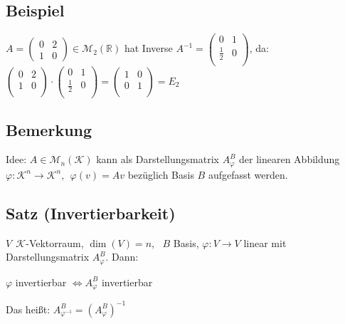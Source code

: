 \documentclass[a4paper, 12pt,titlepage, pdf, headsepline]{scrartcl}
\newcommand{\R}{\mathds{R}}
\newcommand{\K}{\mathcal{K}}
\newcommand{\M}{\mathcal{M}}
\renewcommand{\>}{\rightarrow}
\renewcommand{\*}{\cdot}
\renewcommand{\phi}{\varphi}
\begin{document}
\subsection{Beispiel}
$A = \begin{pmatrix}
0 & 2 \\
1 & 0
\end{pmatrix}\in\M_2(\R)$ hat Inverse $A^{-1} =  \begin{pmatrix}
0 & 1 \\
\frac{1}{2} & 0\\
\end{pmatrix}$, da:\\
$\begin{pmatrix}
0 & 2 \\
1 & 0 \\
\end{pmatrix} \cdot \begin{pmatrix}
0 & 1 \\
\frac{1}{2} & 0 \\
\end{pmatrix} = \begin{pmatrix}
1 & 0  \\
0 & 1 \\
\end{pmatrix} = E_2$
\subsection{Bemerkung}
\label{7.14}
Idee: $A \in \M_n(\K)$ kann als Darstellungsmatrix $A_\phi^B$ der linearen Abbildung $\phi: \K^n \rightarrow \K^n,~~ \phi(v) = Av$ bezüglich Basis $B$ aufgefasst werden.
\subsection{Satz (Invertierbarkeit)}
\label{7.15}
$V~~\K$-Vektorraum, $\dim(V) = n,~~~ B$ Basis, $\phi: V \rightarrow V$ linear mit Darstellungsmatrix $A_\phi^B$. Dann:
\begin{center}
	$\phi$ invertierbar $\Leftrightarrow A^B_\phi$ invertierbar
\end{center}
Das heißt:  $A_{\phi^{-1}}^B = (A_\phi^B)^{-1}$
\end{document}
